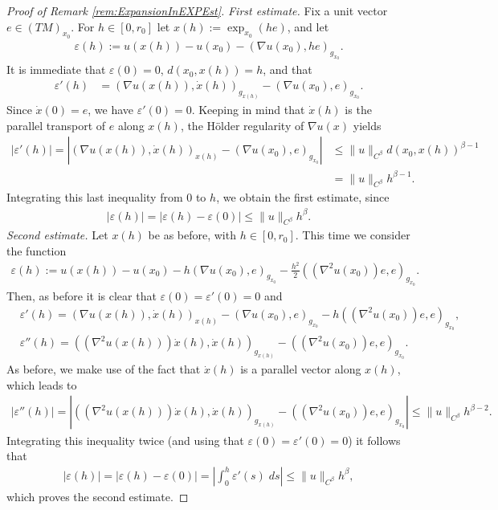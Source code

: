 \documentclass[11pt,reqno]{amsart}
\numberwithin{equation}{section}
\theoremstyle{plain}
\begin{document}
\begin{proof}[Proof of Remark \ref{rem:ExpansionInEXPEst}]
   	

  \emph{First estimate.} Fix a unit vector $e\in (TM)_{x_0}$. For $h \in [0,r_0]$ let $x(h) := \exp_{x_0}(he)$, and let 
  \begin{align*}
    \varepsilon(h) := u\left (x(h)\right )-u(x_0)-(\nabla u(x_0),he)_{g_{x_0}}.
  \end{align*}
  It is immediate that $\varepsilon(0)=0$, $d(x_0,x(h))=h$, and that
  \begin{align*}
    \varepsilon'(h) & = (\nabla u(x(h)),\dot x(h))_{g_{x(h)}}-(\nabla u(x_0),e)_{g_{x_0}}.
  \end{align*}
  Since $\dot x(0)= e$, we have $\varepsilon'(0) = 0$. Keeping in mind that $\dot x(h)$ is the parallel transport of $e$ along $x(h)$, the H\"older regularity of $\nabla u(x)$ yields
  \begin{align*}
    |\varepsilon'(h)| = |(\nabla u(x(h)),\dot x(h))_{x(h)}-(\nabla u(x_0),e)_{g_{x_0}}| & \leq \|u\|_{C^\beta}d(x_0,x(h))^{\beta-1}\\
	& = \|u\|_{C^\beta}h^{\beta-1}.
  \end{align*}
  Integrating this last inequality from $0$ to $h$, we obtain the first estimate, since
  \begin{align*}
    |\varepsilon(h)| = |\varepsilon(h)-\varepsilon(0)| \leq \|u\|_{C^\beta}h^{\beta}.
  \end{align*}
  \emph{Second estimate.} Let $x(h)$ be as before, with $h \in [0,r_0]$. This time we consider the function 
  \begin{align*}
    \varepsilon(h) := u\left (x(h) \right )-u(x_0)-h(\nabla u(x_0),e)_{g_{x_0}}-\frac{h^2}{2}( (\nabla^2 u(x_0))e,e)_{g_{x_0}}.
  \end{align*}
  Then, as before it is clear that $\varepsilon(0)=\varepsilon'(0)=0$ and
  \begin{align*}
    & \varepsilon'(h) = (\nabla u(x(h)),\dot x(h))_{x(h)}-(\nabla u(x_0),e)_{g_{x_0}}-h( (\nabla^2 u(x_0))e,e)_{g_{x_0}},\\
    & \varepsilon''(h) = ( (\nabla^2 u(x(h)))\dot x(h),\dot x(h))_{g_{x(h)}}-( (\nabla^2 u(x_0))e,e)_{g_{x_0}}.
  \end{align*}
  As before, we make use of the fact that $\dot x(h)$ is a parallel vector along $x(h)$, which leads to
  \begin{align*}
    |\varepsilon''(h)| = |  ( (\nabla^2 u(x(h)))\dot x(h),\dot x(h))_{g_{x(h)}}-( (\nabla^2 u(x_0))e,e)_{g_{x_0}}| \leq \|u\|_{C^\beta}h^{\beta-2}.	  
  \end{align*}	  
  Integrating this inequality twice (and using that $\varepsilon(0)=\varepsilon'(0)=0$) it follows that
  \begin{align*}
    |\varepsilon(h)| = |\varepsilon(h)-\varepsilon(0)| = \left | \int_0^h \varepsilon'(s)\;ds \right | \leq \|u\|_{C^\beta}h^\beta,
  \end{align*}	  
  which proves the second estimate.
  
\end{proof}
\end{document}
